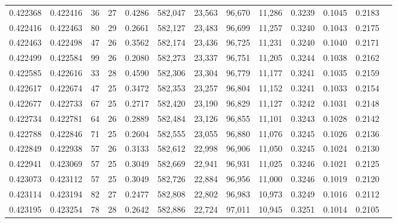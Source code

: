 \begin{tabular}{rrrrrrrrrrrrr}
0.422368 & 0.422416 &    36 &  27 &                                     0.4286 & 582,047 &  23,563 &  96,670 &  11,286 & 0.3239 & 0.1045 & 0.2183 \\
0.422416 & 0.422463 &    80 &  29 &                                     0.2661 & 582,127 &  23,483 &  96,699 &  11,257 & 0.3240 & 0.1043 & 0.2175 \\
0.422463 & 0.422498 &    47 &  26 &                                     0.3562 & 582,174 &  23,436 &  96,725 &  11,231 & 0.3240 & 0.1040 & 0.2171 \\
0.422499 & 0.422584 &    99 &  26 &                                     0.2080 & 582,273 &  23,337 &  96,751 &  11,205 & 0.3244 & 0.1038 & 0.2162 \\
0.422585 & 0.422616 &    33 &  28 &                                     0.4590 & 582,306 &  23,304 &  96,779 &  11,177 & 0.3241 & 0.1035 & 0.2159 \\
0.422617 & 0.422674 &    47 &  25 &                                     0.3472 & 582,353 &  23,257 &  96,804 &  11,152 & 0.3241 & 0.1033 & 0.2154 \\
0.422677 & 0.422733 &    67 &  25 &                                     0.2717 & 582,420 &  23,190 &  96,829 &  11,127 & 0.3242 & 0.1031 & 0.2148 \\
0.422734 & 0.422781 &    64 &  26 &                                     0.2889 & 582,484 &  23,126 &  96,855 &  11,101 & 0.3243 & 0.1028 & 0.2142 \\
0.422788 & 0.422846 &    71 &  25 &                                     0.2604 & 582,555 &  23,055 &  96,880 &  11,076 & 0.3245 & 0.1026 & 0.2136 \\
0.422849 & 0.422938 &    57 &  26 &                                     0.3133 & 582,612 &  22,998 &  96,906 &  11,050 & 0.3245 & 0.1024 & 0.2130 \\
0.422941 & 0.423069 &    57 &  25 &                                     0.3049 & 582,669 &  22,941 &  96,931 &  11,025 & 0.3246 & 0.1021 & 0.2125 \\
0.423073 & 0.423112 &    57 &  25 &                                     0.3049 & 582,726 &  22,884 &  96,956 &  11,000 & 0.3246 & 0.1019 & 0.2120 \\
0.423114 & 0.423194 &    82 &  27 &                                     0.2477 & 582,808 &  22,802 &  96,983 &  10,973 & 0.3249 & 0.1016 & 0.2112 \\
0.423195 & 0.423254 &    78 &  28 &                                     0.2642 & 582,886 &  22,724 &  97,011 &  10,945 & 0.3251 & 0.1014 & 0.2105 \\

\end{tabular}
